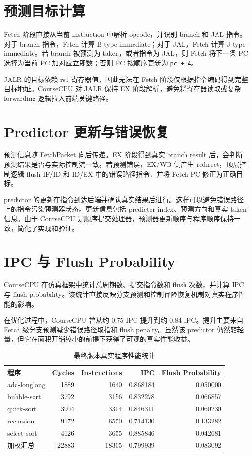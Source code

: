 \documentclass[UTF8,a4paper,12pt]{ctexrep}
\begin{document}
\section{预测目标计算}

Fetch 阶段直接从当前 instruction 中解析 opcode，并识别 branch 和 JAL 指令。对于 branch 指令，Fetch 计算 B-type immediate；对于 JAL，Fetch 计算 J-type immediate。若 branch 被预测为 taken，或者指令为 JAL，则 Fetch 将下一条 PC 选择为当前 PC 加对应立即数；否则 PC 按顺序更新为 \texttt{pc + 4}。

JALR 的目标依赖 rs1 寄存器值，因此无法在 Fetch 阶段仅根据指令编码得到完整目标地址。CourseCPU 对 JALR 保持 EX 阶段解析，避免将寄存器读取或复杂 forwarding 逻辑拉入前端关键路径。

\section{Predictor 更新与错误恢复}

预测信息随 FetchPacket 向后传递。EX 阶段得到真实 branch result 后，会判断预测结果是否与实际控制流一致。若预测错误，EX/WB 侧产生 redirect，顶层控制逻辑 flush IF/ID 和 ID/EX 中的错误路径指令，并将 Fetch PC 修正为正确目标。

predictor 的更新在指令到达后端并确认真实结果后进行。这样可以避免错误路径上的指令污染预测器状态。更新信息包括 predictor index、预测方向和真实 taken 信息。由于 CourseCPU 是顺序提交处理器，预测器更新顺序与程序顺序保持一致，简化了实现和验证。

\section{IPC 与 Flush Probability}

CourseCPU 在仿真框架中统计总周期数、提交指令数和 flush 次数，并计算 IPC 与 flush probability。该统计直接反映分支预测和控制冒险恢复机制对真实程序性能的影响。

在优化过程中，CourseCPU 曾从约 0.75 IPC 提升到约 0.84 IPC。提升主要来自 Fetch 级分支预测减少错误路径取指和 flush penalty。虽然该 predictor 仍然较轻量，但它在面积开销较小的前提下获得了可观的真实性能收益。

\begin{table}[htbp]
  \centering
  \caption{最终版本真实程序性能统计}
  \begin{tabular}{lrrrr}
    \toprule
    程序 & Cycles & Instructions & IPC & Flush Probability \\
    \midrule
    add-longlong & 1889 & 1640 & 0.868184 & 0.050000 \\
    bubble-sort & 3792 & 3156 & 0.832278 & 0.066857 \\
    quick-sort & 3904 & 3304 & 0.846311 & 0.060230 \\
    recursion & 9172 & 6550 & 0.714130 & 0.133282 \\
    select-sort & 4126 & 3655 & 0.885846 & 0.042681 \\
    \midrule
    加权汇总 & 22883 & 18305 & 0.799939 & 0.083092 \\
    \bottomrule
  \end{tabular}
\end{table}
\end{document}
